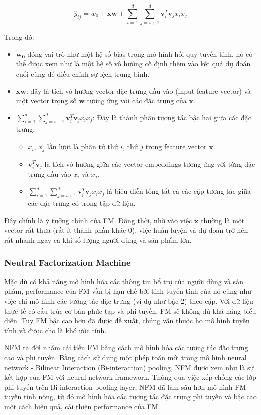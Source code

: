 $$\hat{y}_{ij} = w_0 + \mathbf{xw} + \sum_{i=1}^{d}\sum_{j=i+1}^{d} \mathbf{v}_i^T\mathbf{v}_jx_ix_j$$

Trong đó:

\begin{itemize}
    \item $\mathbf{w_0}$ đóng vai trò như một hệ số bias trong mô hình hồi quy tuyến tính, 
    nó có thể được xem như là một hệ số vô hướng cố định thêm vào kết quả dự đoán cuối cùng để điều chỉnh sự lệch trung bình.
    \item $\mathbf{xw}$: đây là tích vô hướng vector đặc trưng đầu vào (input feature vector) 
    và một vector trọng số $\mathbf{w}$ tương ứng với các đặc trưng của $\mathbf{x}$.
    \item $\sum_{i=1}^{d}\sum_{j=i+1}^{d} \mathbf{v}_i^T\mathbf{v}_jx_ix_j$: Đây là thành phần tương tác bậc hai giữa các đặc trưng.
    \begin{itemize}
        \item $x_i$, $x_j$ lần lượt là phần tử thứ $i$, thứ $j$ trong feature vector $\mathbf{x}$.
        \item $\mathbf{v}_i^T\mathbf{v}_j$ là tích vô hướng giữa các vector embeddings tương ứng với từng đặc trưng đầu vào $x_i$ và $x_j$.
        \item $\sum_{i=1}^{d}\sum_{j=i+1}^{d} \mathbf{v}_i^T\mathbf{v}_jx_ix_j$ là biểu diễn tổng tất cả các cặp tương tác giữa các đặc trưng có trong tập dữ liệu.    
    \end{itemize}
\end{itemize}

Đây chính là ý tưởng chính của FM. Đồng thời, nhờ vào việc $\mathbf{x}$ thường là một vector rất thưa (rất ít thành phần khác 0), 
việc huấn luyện và dự đoán trở nên rất nhanh ngay cả khi số lượng người dùng và sản phẩm lớn.

\subsubsection{Neutral Factorization Machine}
Mặc dù có khả năng mô hình hóa các thông tin bổ trợ của người dùng và sản phẩm, performance của FM vẫn bị hạn chế 
bởi tính tuyến tính của nó cũng như việc chỉ mô hình các tương tác đặc trưng (ví dụ như bậc 2) theo cặp. 
Với dữ liệu thực tế có cấu trúc cơ bản phức tạp và phi tuyến, FM sẽ không đủ khả năng biểu diễn. 
Tuy FM bậc cao hơn đã được đề xuất, chúng vẫn thuộc họ mô hình tuyến tính và được cho là khó ước tính.

\indent NFM ra đời nhằm cải tiến FM bằng cách mô hình hóa các tương tác đặc trưng cao và phi tuyến. 
Bằng cách sử dụng một phép toán mới trong mô hình neural network - Bilinear Interaction (Bi-interaction) pooling, 
NFM được xem như là sự kết hợp của FM với neural network framework. Thông qua việc xếp chồng các lớp phi tuyến trên Bi-interaction pooling layer, 
NFM đã làm sâu hơn mô hình FM tuyến tính nông, từ đó mô hình hóa các tương tác đặc trưng phi tuyến và bậc cao một cách hiệu quả, cải thiện performance của FM.

